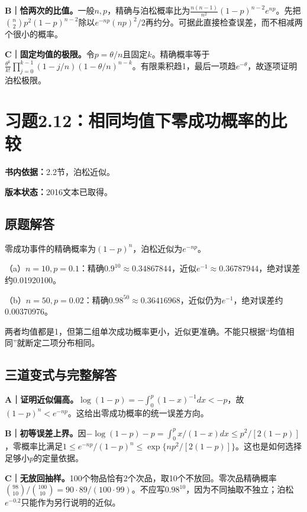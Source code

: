 \documentclass[
  11pt,
  a4paper,
  UTF8,fontset=fandol]{ctexart}
\let\OldSection\section
\renewcommand{\section}{\Needspace{7\baselineskip}\OldSection}
\let\OldSubsection\subsection
\renewcommand{\subsection}{\Needspace{5\baselineskip}\OldSubsection}
\begin{document}
\textbf{B｜恰两次的比值。}一般\(n,p\)，精确与泊松概率比为\(\frac{n(n-1)}{n^2}(1-p)^{n-2}e^{np}\)。先把\(\binom n2p^2(1-p)^{n-2}\)除以\(e^{-np}(np)^2/2\)再约分。可据此直接检查误差，而不相减两个很小的概率。

\textbf{C｜固定均值的极限。}令\(p=\theta/n\)且固定\(k\)。精确概率等于\(\frac{\theta^k}{k!}\prod_{j=0}^{k-1}(1-j/n)(1-\theta/n)^{n-k}\)。有限乘积趋1，最后一项趋\(e^{-\theta}\)，故逐项证明泊松极限。

\newpage

\section{习题2.12：相同均值下零成功概率的比较}\label{ux4e60ux98982.12ux76f8ux540cux5747ux503cux4e0bux96f6ux6210ux529fux6982ux7387ux7684ux6bd4ux8f83}

\textbf{书内依据：}2.2节，泊松近似。

\textbf{版本状态：}2016文本已取得。

\subsection{原题解答}\label{ux539fux9898ux89e3ux7b54-11}

零成功事件的精确概率为\((1-p)^n\)，泊松近似为\(e^{-np}\)。

（a）\(n=10,p=0.1\)：精确\(0.9^{10}\approx0.34867844\)，近似\(e^{-1}\approx0.36787944\)，绝对误差约0.01920100。

（b）\(n=50,p=0.02\)：精确\(0.98^{50}\approx0.36416968\)，近似仍为\(e^{-1}\)，绝对误差约0.00370976。

两者均值都是1，但第二组单次成功概率更小，近似更准确。不能只根据``均值相同''就断定二项分布相同。

\subsection{三道变式与完整解答}\label{ux4e09ux9053ux53d8ux5f0fux4e0eux5b8cux6574ux89e3ux7b54-11}

\textbf{A｜证明近似偏高。}\(\log(1-p)=-\int_0^p(1-x)^{-1}dx<-p\)，故\((1-p)^n<e^{-np}\)。这给出零成功概率的统一误差方向。

\textbf{B｜初等误差上界。}因\(-\log(1-p)-p=\int_0^p x/(1-x)dx\le p^2/[2(1-p)]\)，零概率比满足\(1\le e^{-np}/(1-p)^n\le\exp\{np^2/[2(1-p)]\}\)。这也是如何选择足够小\(p\)的定量依据。

\textbf{C｜无放回抽样。}100个物品恰有2个次品，取10个不放回。零次品精确概率\(\binom{98}{10}/\binom{100}{10}=90\cdot89/(100\cdot99)\)。不应写\(0.98^{10}\)，因为不同抽取不独立；泊松\(e^{-0.2}\)只能作为另行说明的近似。
\end{document}
